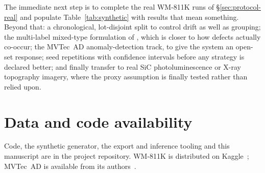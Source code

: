 \documentclass[11pt,a4paper]{article}
\begin{document}
The immediate next step is to complete the real WM-811K runs of
\S\ref{sec:protocol-real} and populate Table~\ref{tab:synthetic} with results
that mean something. Beyond that: a chronological, lot-disjoint split to
control drift as well as grouping; the multi-label mixed-type formulation of
\citet{wang2020mixedwm38}, which is closer to how defects actually co-occur;
the MVTec~AD anomaly-detection track, to give the system an open-set response;
seed repetitions with confidence intervals before any strategy is declared
better; and finally transfer to real SiC photoluminescence or X-ray topography
imagery, where the proxy assumption is finally tested rather than relied upon.

\section*{Data and code availability}

Code, the synthetic generator, the export and inference tooling and this
manuscript are in the project repository. WM-811K is distributed on
Kaggle~\citep{wu2015wafer}; MVTec~AD is available from its
authors~\citep{bergmann2019mvtec}.



\end{document}
